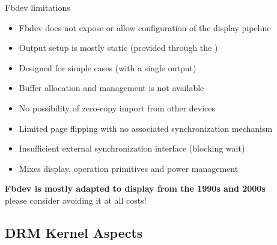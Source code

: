 \begin{frame}{Fbdev limitations}
  \begin{itemize}
  \item Fbdev does not expose or allow configuration of the display pipeline
  \item Output setup is mostly static (provided through the )
  \item Designed for simple cases (with a single output)
  \item Buffer allocation and management is not available
  \item No possibility of zero-copy import from other devices
  \item Limited page flipping with no associated synchronization mechanism
  \item Insufficient external synchronization interface (blocking wait)
  \item Mixes display, operation primitives and power management
  \end{itemize}

  \begin{center}
  \textbf{Fbdev is mostly adapted to display from the 1990s and 2000s}\\
  \small please consider avoiding it at all costs!
  \end{center}
\end{frame}

\subsection{DRM Kernel Aspects}

